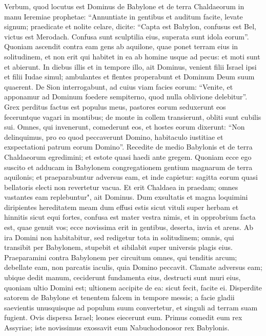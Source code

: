 \begin{biblechapter}  
\verse Verbum, quod locutus est Dominus de Babylone et de terra Chaldaeorum in manu Ieremiae prophetae: 
\verse “Annuntiate in gentibus et auditum facite, levate signum; praedicate et nolite celare, dicite: “Capta est Babylon, confusus est Bel, victus est Merodach. Confusa sunt sculptilia eius, superata sunt idola eorum”. 
\verse Quoniam ascendit contra eam gens ab aquilone, quae ponet terram eius in solitudinem, et non erit qui habitet in ea ab homine usque ad pecus: et moti sunt et abierunt. 
\verse In diebus illis et in tempore illo, ait Dominus, venient filii Israel ipsi et filii Iudae simul; ambulantes et flentes properabunt et Dominum Deum suum quaerent. 
\verse De Sion interrogabunt, ad cuius viam facies eorum: “Venite, et apponamur ad Dominum foedere sempiterno, quod nulla oblivione delebitur”. 
\verse Grex perditus factus est populus meus, pastores eorum seduxerunt eos feceruntque vagari in montibus; de monte in collem transierunt, obliti sunt cubilis sui. 
\verse Omnes, qui invenerunt, comederunt eos, et hostes eorum dixerunt: “Non delinquimus, pro eo quod peccaverunt Domino, habitaculo iustitiae et exspectationi patrum eorum Domino”. 
\verse Recedite de medio Babylonis et de terra Chaldaeorum egredimini; et estote quasi haedi ante gregem. 
\verse Quoniam ecce ego suscito et adducam in Babylonem congregationem gentium magnarum de terra aquilonis; et praeparabuntur adversus eam, et inde capietur: sagitta eorum quasi bellatoris electi non revertetur vacua. 
\verse Et erit Chaldaea in praedam; omnes vastantes eam replebuntur", ait Dominus. 
\verse Dum exsultatis et magna loquimini diripientes hereditatem meam dum effusi estis sicut vituli super herbam et hinnitis sicut equi fortes, 
\verse confusa est mater vestra nimis, et in opprobrium facta est, quae genuit vos; ecce novissima erit in gentibus, deserta, invia et arens. 
\verse Ab ira Domini non habitabitur, sed redigetur tota in solitudinem; omnis, qui transibit per Babylonem, stupebit et sibilabit super universis plagis eius. 
\verse Praeparamini contra Babylonem per circuitum omnes, qui tenditis arcum; debellate eam, non parcatis iaculis, quia Domino peccavit. 
\verse Clamate adversus eam; ubique dedit manum, ceciderunt fundamenta eius, destructi sunt muri eius, quoniam ultio Domini est; ultionem accipite de ea: sicut fecit, facite ei. 
\verse Disperdite satorem de Babylone et tenentem falcem in tempore messis; a facie gladii saevientis unusquisque ad populum suum convertetur, et singuli ad terram suam fugient. 
\verse Ovis dispersa Israel; leones eiecerunt eum. Primus comedit eum rex Assyriae; iste novissimus exossavit eum Nabuchodonosor rex Babylonis. 

\end{biblechapter}
